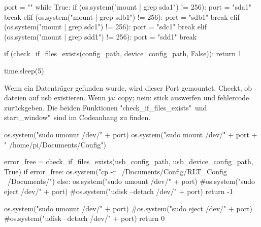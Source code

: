 \begin{pythoncode}
	port = ""
	while True:
		if (os.system("mount | grep sda1") != 256):
			port = "sda1"
			break
		elif (os.system("mount | grep sdb1") != 256):
			port = "sdb1"
			break
		elif (os.system("mount | grep sdc1") != 256):
			port = "sdc1"
			break
		elif (os.system("mount | grep sdd1") != 256):
			port = "sdd1"
			break
		
		if (check_if_files_exists(config_path, device_config_path, False)):
			return 1
			
		time.sleep(5)
\end{pythoncode}

Wenn ein Datenträger gefunden wurde, wird dieser Port gemountet. Checkt, ob dateien auf usb existieren. Wenn ja: copy; nein: stick auswerfen und fehlercode zurückgeben. Die beiden Funktionen "check\_if\_files\_exists"\ und \dq start\_window"\ sind im Codeanhang zu finden. 

\begin{pythoncode}
	os.system("sudo umount /dev/" + port)
	os.system("sudo mount /dev/" + port + " /home/pi/Documents/Config")
	
	error_free = check_if_files_exists(usb_config_path, usb_device_config_path, True)
	if error_free:
		os.system("cp -r ~/Documents/Config/RLT_Config ~/Documents/")
	else:
		os.system("sudo umount /dev/" + port)
		#os.system("sudo eject /dev/" + port) 
		#os.system("udisk --detach /dev/" + port)
		return -1
		
	os.system("sudo umount /dev/" + port)
	#os.system("sudo eject /dev/" + port) 
	#os.system("udisk --detach /dev/" + port)
	return 0
\end{pythoncode}